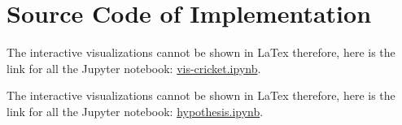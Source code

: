 \documentclass[fleqn,10pt]{wlscirep}
\begin{document}
\section{Source Code of Implementation}


The interactive visualizations cannot be shown in LaTex therefore, here is the link for all the Jupyter notebook: \href{https://nbviewer.jupyter.org/github/dev-SB/cricket-bi/blob/master/vis-cricket.ipynb}{vis-cricket.ipynb}.

The interactive visualizations cannot be shown in LaTex therefore, here is the link for all the Jupyter notebook: \href{https://nbviewer.jupyter.org/github/dev-SB/cricket-bi/blob/master/hypothesis.ipynb}{hypothesis.ipynb}.

\end{document}
